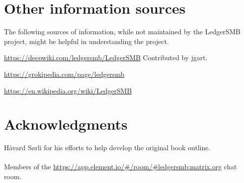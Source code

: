 \section*{Other information sources}
\label{sec-other-sources}

The following sources of information, while not maintained by the LedgerSMB project, might be helpful in understanding the project.

\url{https://deepwiki.com/ledgersmb/LedgerSMB} Contributed by jgart.
 
\url{https://grokipedia.com/page/ledgersmb}

\url{https://en.wikipedia.org/wiki/LedgerSMB}


\section*{Acknowledgments}
\label{sec-acknowledgements}

H{\aa}vard S{\o}rli for his efforts to help develop the original book outline.\\
~ \\
Members of the \url{https://app.element.io/#/room/#ledgersmb:matrix.org}  chat room.










\clearpage
{}
\printglossary[type=acronym]

\clearpage
{}
\printglossary[title={Definition of terms}]

\clearpage
{}
\printindex



